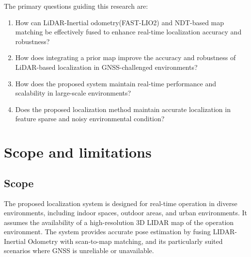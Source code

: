 The primary questions guiding this research are:
\begin{enumerate}
	\item How can LiDAR-Inertial odometry(FAST-LIO2) and NDT-based map matching be effectively fused to enhance real-time localization accuracy and robustness?
	\item How does integrating a prior map improve the accuracy and robustness of LiDAR-based localization in GNSS-challenged environments?

	\item How does the proposed system maintain real-time performance and scalability in large-scale environments?
	\item Does the proposed localization method maintain accurate localization in feature sparse and noisy environmental condition?

\end{enumerate}
\section{Scope and limitations}
\subsection{Scope}
The proposed localization system is designed for real-time operation in diverse environments, including indoor spaces, outdoor areas, and urban environments. It assumes the availability of a high-resolution 3D LIDAR map of the operation environment. The system provides accurate pose estimation by fusing LIDAR-Inertial Odometry with scan-to-map matching, and its particularly suited scenarios where GNSS is unreliable or unavailable.
